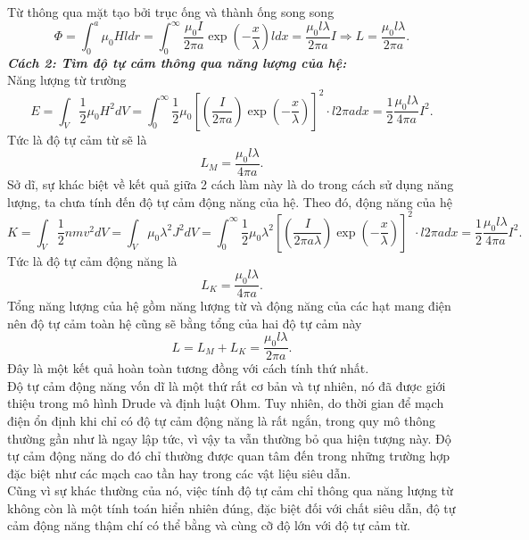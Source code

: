 \begin{enumerate}
    Từ thông qua mặt tạo bởi trục ống và thành ống song song
    \begin{equation} \label{eq11_Kinetic_Inductance}
        \Phi = \int_0^a \mu_0 H l dr = \int_0^\infty \dfrac{\mu_0 I}{2 \pi a} \exp \left( - \dfrac{x}{\lambda} \right) l dx = \dfrac{\mu_0 l \lambda}{2 \pi a} I \Rightarrow L = \dfrac{\mu_0 l \lambda}{2 \pi a}.
    \end{equation}
    \textbf{ \textit{Cách 2: Tìm độ tự cảm thông qua năng lượng của hệ:}} \\
    Năng lượng từ trường
    \begin{equation} \label{eq12_Kinetic_Inductance}
        E = \int_V \dfrac{1}{2} \mu_0 H^2 dV 
        = \int_0^\infty \dfrac{1}{2} \mu_0 \left[ \left( \dfrac{I}{2 \pi a} \right) \exp \left( - \dfrac{x}{\lambda} \right) \right]^2 \cdot l 2 \pi a dx 
        = \dfrac{1}{2} \dfrac{\mu_0 l \lambda}{4 \pi a} I^2. 
    \end{equation}
    Tức là độ tự cảm từ sẽ là
    \begin{equation} \label{eq13_Kinetic_Inductance}
        L_M = \dfrac{\mu_0 l \lambda}{4 \pi a}.
    \end{equation}
    Sở dĩ, sự khác biệt về kết quả giữa 2 cách làm này là do trong cách sử dụng năng lượng, ta chưa tính đến độ tự cảm động năng của hệ. Theo đó, động năng của hệ
    \begin{equation} \label{eq14_Kinetic_Inductance}
        K = \int_V \dfrac{1}{2} n m v^2 dV 
        = \int_V \mu_0 \lambda^2 J^2 dV 
        = \int_0^\infty \dfrac{1}{2} \mu_0 \lambda^2 \left[ \left( \dfrac{I}{2 \pi a \lambda} \right) \exp \left( - \dfrac{x}{\lambda} \right) \right]^2 \cdot l 2 \pi a dx
        = \dfrac{1}{2} \dfrac{\mu_0 l \lambda}{4 \pi a} I^2. 
    \end{equation}
    Tức là độ tự cảm động năng là
    \begin{equation} \label{eq15_Kinetic_Inductance}
        L_K = \dfrac{\mu_0 l \lambda}{4 \pi a}.
    \end{equation}
    Tổng năng lượng của hệ gồm năng lượng từ và động năng của các hạt mang điện nên độ tự cảm toàn hệ cũng sẽ bằng tổng của hai độ tự cảm này
    \begin{equation} \label{eq16_Kinetic_Inductance}
        L = L_M +L_K = \dfrac{\mu_0 l \lambda}{2 \pi a}.
    \end{equation}
    Đây là một kết quả hoàn toàn tương đồng với cách tính thứ nhất. \\
    Độ tự cảm động năng vốn dĩ là một thứ rất cơ bản và tự nhiên, nó đã được giới thiệu trong mô hình Drude và định luật Ohm. Tuy nhiên, do thời gian để mạch điện ổn định khi chỉ có độ tự cảm động năng là rất ngắn, trong quy mô thông thường gần như là ngay lập tức, vì vậy ta vẫn thường bỏ qua hiện tượng này. Độ tự cảm động năng do đó chỉ thường được quan tâm đến trong những trường hợp đặc biệt như các mạch cao tần hay trong các vật liệu siêu dẫn. \\
    Cũng vì sự khác thường của nó, việc tính độ tự cảm chỉ thông qua năng lượng từ không còn là một tính toán hiển nhiên đúng, đặc biệt đối với chất siêu dẫn, độ tự cảm động năng thậm chí có thể bằng và cùng cỡ độ lớn với độ tự cảm từ.
\end{enumerate}

